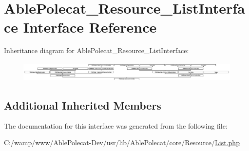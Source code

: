 \hypertarget{interface_able_polecat___resource___list_interface}{}\section{Able\+Polecat\+\_\+\+Resource\+\_\+\+List\+Interface Interface Reference}
\label{interface_able_polecat___resource___list_interface}
Inheritance diagram for Able\+Polecat\+\_\+\+Resource\+\_\+\+List\+Interface\+:\begin{figure}[H]
\begin{center}
\leavevmode
\includegraphics[height=1.067073cm]{interface_able_polecat___resource___list_interface}
\end{center}
\end{figure}
\subsection*{Additional Inherited Members}


The documentation for this interface was generated from the following file\+:\begin{DoxyCompactItemize}
\item 
C\+:/wamp/www/\+Able\+Polecat-\/\+Dev/usr/lib/\+Able\+Polecat/core/\+Resource/\hyperlink{_list_8php}{List.\+php}\end{DoxyCompactItemize}
